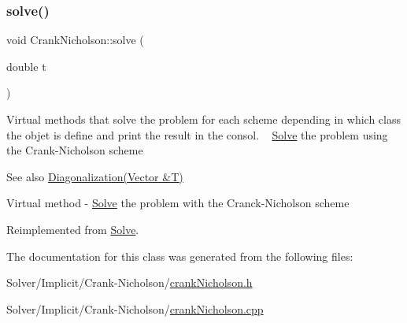 \subsubsection{\texorpdfstring{solve()}{solve()}}
{\footnotesize\ttfamily void Crank\+Nicholson\+::solve (\begin{DoxyParamCaption}\item[{double}]{t }\end{DoxyParamCaption})\hspace{0.3cm}{\ttfamily [virtual]}}

Virtual methods that solve the problem for each scheme depending in which class the objet is define and print the result in the consol. ~\newline
 \hyperlink{class_solve}{Solve} the problem using the Crank-\/\+Nicholson scheme \begin{DoxySeeAlso}{See also}
\hyperlink{class_implicit_a572fff2232977c83c432f993f37a7853}{Diagonalization(\+Vector \&\+T)}
\end{DoxySeeAlso}
Virtual method -\/ \hyperlink{class_solve}{Solve} the problem with the Cranck-\/\+Nicholson scheme 

Reimplemented from \hyperlink{class_solve_a1a56722993fdabea9928637d7dd8a2c7}{Solve}.



The documentation for this class was generated from the following files\+:\begin{DoxyCompactItemize}
\item 
Solver/\+Implicit/\+Crank-\/\+Nicholson/\hyperlink{crank_nicholson_8h}{crank\+Nicholson.\+h}\item 
Solver/\+Implicit/\+Crank-\/\+Nicholson/\hyperlink{crank_nicholson_8cpp}{crank\+Nicholson.\+cpp}\end{DoxyCompactItemize}
